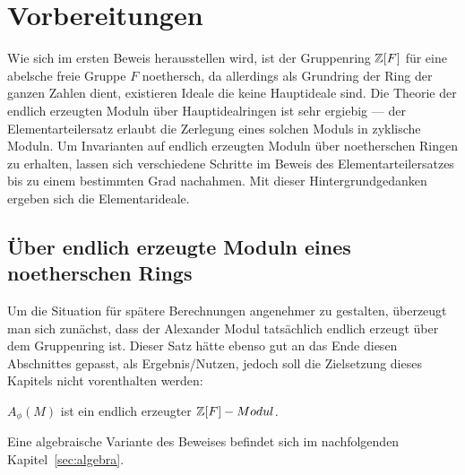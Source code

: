 
\section{Vorbereitungen}
\label{sec:vorbereitungen}

Wie sich im ersten Beweis herausstellen wird, ist der Gruppenring $\mathbb{Z}[F]$ für eine abelsche freie Gruppe $F$ noethersch, da allerdings als Grundring der Ring der ganzen Zahlen dient, existieren Ideale die keine Hauptideale sind. Die Theorie der endlich erzeugten Moduln über Hauptidealringen ist sehr ergiebig --- der Elementarteilersatz erlaubt die Zerlegung eines solchen Moduls in zyklische Moduln. Um Invarianten auf endlich erzeugten Moduln über noetherschen Ringen zu erhalten, lassen sich verschiedene Schritte im Beweis des Elementarteilersatzes bis zu einem bestimmten Grad nachahmen. Mit dieser Hintergrundgedanken ergeben sich die Elementarideale. 

\subsection{Über endlich erzeugte Moduln eines noetherschen Rings}



Um die Situation für spätere Berechnungen angenehmer zu gestalten, überzeugt man sich zunächst, dass der Alexander Modul tatsächlich endlich erzeugt über dem Gruppenring ist. Dieser Satz hätte ebenso gut an das Ende diesen Abschnittes gepasst, als Ergebnis/Nutzen, jedoch soll die Zielsetzung dieses Kapitels nicht vorenthalten werden: 
\begin{prop}
\label{prop:alexendlerz}
		$A_\phi(M)$ ist ein endlich erzeugter $\mathbb{Z}[F]-Modul$.
\end{prop}
\begin{bem}\label{rem:AlexModulendlerz}
	Eine algebraische Variante des Beweises befindet sich im nachfolgenden Kapitel~\ref{sec:algebra}. 
\end{bem}

